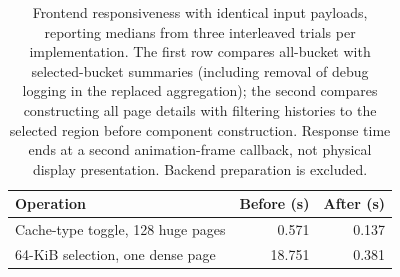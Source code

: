\begin{table}[t]
\centering
\small
\begin{tabular}{lrr}
\hline
Operation & Before (s) & After (s) \\
\hline
Cache-type toggle, 128 huge pages & 0.571 & 0.137 \\
64-KiB selection, one dense page & 18.751 & 0.381 \\
\hline
\end{tabular}
\caption{Frontend responsiveness with identical input payloads, reporting
medians from three interleaved trials per implementation. The first row
compares all-bucket with selected-bucket summaries (including removal of debug
logging in the replaced aggregation); the second compares constructing all
page details with filtering histories to the selected region before component
construction. Response time ends at a second animation-frame callback, not
physical display presentation. Backend preparation is excluded.}
\label{tab:heaplens-interface-ablation}
\end{table}

